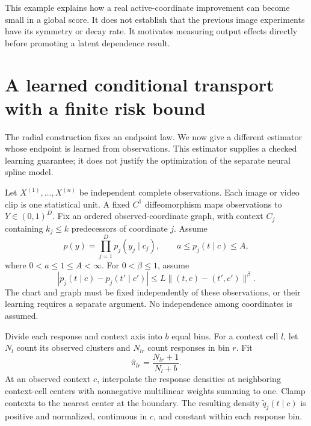 \documentclass[11pt]{article}
\begin{document}
This example explains how a real active-coordinate improvement can become small in a global score. It does not establish that the previous image experiments have its symmetry or decay rate. It motivates measuring output effects directly before promoting a latent dependence result.

\section{A learned conditional transport with a finite risk bound}
The radial construction fixes an endpoint law. We now give a different estimator whose endpoint is learned from observations. This estimator supplies a checked learning guarantee; it does not justify the optimization of the separate neural spline model.

Let $X^{(1)},\ldots,X^{(n)}$ be independent complete observations. Each image or video clip is one statistical unit. A fixed $C^1$ diffeomorphism maps observations to $Y\in(0,1)^D$. Fix an ordered observed-coordinate graph, with context $C_j$ containing $k_j\leq k$ predecessors of coordinate $j$. Assume
\begin{equation}
 p(y)=\prod_{j=1}^D p_j(y_j\mid c_j),\qquad
 a\leq p_j(t\mid c)\leq A,
\end{equation}
where $0<a\leq1\leq A<\infty$. For $0<\beta\leq1$, assume
\begin{equation}
 |p_j(t\mid c)-p_j(t'\mid c')|
 \leq L\|(t,c)-(t',c')\|^\beta.
\end{equation}
The chart and graph must be fixed independently of these observations, or their learning requires a separate argument. No independence among coordinates is assumed.

Divide each response and context axis into $b$ equal bins. For a context cell $l$, let $N_l$ count its observed clusters and $N_{lr}$ count responses in bin $r$. Fit
\begin{equation}
 \widehat\pi_{lr}=\frac{N_{lr}+1}{N_l+b}.
\end{equation}
At an observed context $c$, interpolate the response densities at neighboring context-cell centers with nonnegative multilinear weights summing to one. Clamp contexts to the nearest center at the boundary. The resulting density $\widetilde q_j(t\mid c)$ is positive and normalized, continuous in $c$, and constant within each response bin.
\end{document}
